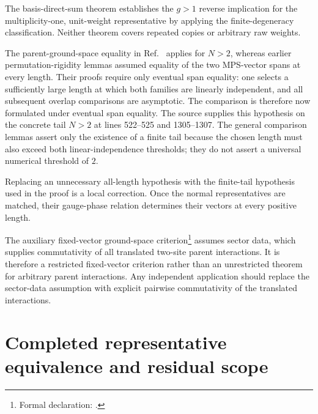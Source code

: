 \documentclass{article}
\begin{document}
The basis-direct-sum theorem establishes the $g>1$ reverse implication for the
multiplicity-one, unit-weight representative by applying the finite-degeneracy
classification. Neither theorem covers repeated copies or arbitrary raw
weights.

The parent-ground-space equality in Ref.~\cite{Cirac2016MPDO_arXiv} applies
for $N>2$, whereas earlier permutation-rigidity lemmas assumed equality
of the two MPS-vector spans at every length. Their proofs require only eventual
span equality: one selects a sufficiently large length at which both families
are linearly independent, and all subsequent overlap comparisons are
asymptotic. The comparison is therefore now formulated under eventual span
equality. The source supplies this hypothesis on the concrete tail $N>2$ at
lines 522--525 and 1305--1307. The general comparison lemmas assert only the
existence of a finite tail because the chosen length must also exceed both
linear-independence thresholds; they do not assert a universal numerical
threshold of $2$.

Replacing an unnecessary all-length hypothesis with the finite-tail
hypothesis used in the proof is a local correction. Once the normal
representatives are matched, their gauge-phase relation determines their
vectors at every positive length.

The auxiliary fixed-vector ground-space criterion\footnote{Formal declaration:
.}
assumes sector data, which supplies commutativity of all translated two-site
parent interactions. It is therefore a restricted fixed-vector criterion rather
than an unrestricted theorem for arbitrary parent interactions. Any
independent application should replace the sector-data assumption with
explicit pairwise commutativity of the translated interactions.

\section{Completed representative equivalence and residual scope}
\end{document}
